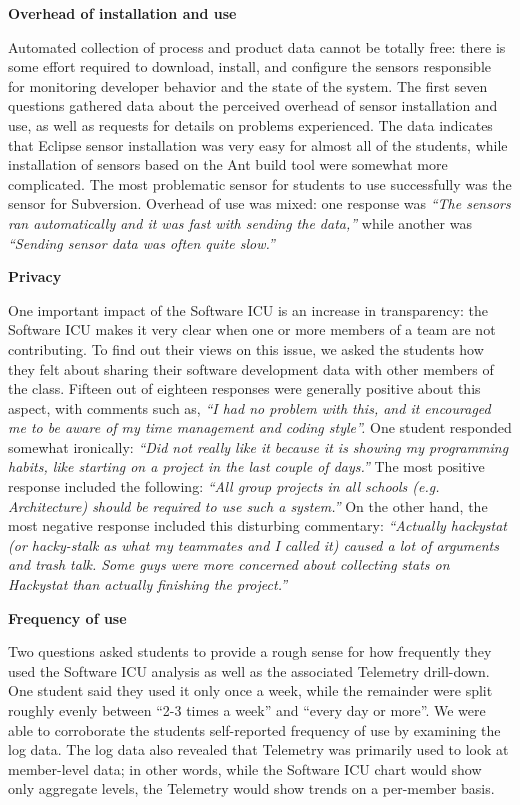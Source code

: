 \documentclass{acm_proc_article-sp}
\begin{document}
{\bf Overhead of installation and use}

Automated collection of process and product data cannot be totally free:
there is some effort required to download, install, and configure the
sensors responsible for monitoring developer behavior and the state of the
system.  The first seven questions gathered data about the perceived
overhead of sensor installation and use, as well as requests for details on
problems experienced. The data indicates that Eclipse sensor installation
was very easy for almost all of the students, while installation of sensors
based on the Ant build tool were somewhat more complicated. The most
problematic sensor for students to use successfully was the sensor for
Subversion.  Overhead of use was mixed: one response was {\em ``The sensors ran
automatically and it was fast with sending the data,''} while another was
{\em ``Sending sensor data was often quite slow.''}  

{\bf Privacy}

One important impact of the Software ICU is an increase in transparency:
the Software ICU makes it very clear when one or more members of a team are
not contributing.  To find out their views on this issue, we asked the
students how they felt about sharing their software development data with
other members of the class.  Fifteen out of eighteen responses were
generally positive about this aspect, with comments such as, {\em ``I had
no problem with this, and it encouraged me to be aware of my time
management and coding style''.}  One student responded somewhat ironically:
{\em ``Did not really like it because it is showing my programming habits,
like starting on a project in the last couple of days.''}  The most
positive response included the following: {\em ``All group projects in all
schools (e.g. Architecture) should be required to use such a system.''}  On
the other hand, the most negative response included this disturbing
commentary: {\em ``Actually hackystat (or hacky-stalk as what my teammates
and I called it) caused a lot of arguments and trash talk.  Some guys were
more concerned about collecting stats on Hackystat than actually finishing
the project.''}

{\bf Frequency of use}

Two questions asked students to provide a rough sense for how frequently
they used the Software ICU analysis as well as the associated Telemetry
drill-down.  One student said they used it only once a week, while the
remainder were split roughly evenly between ``2-3 times a week'' and
``every day or more''.  We were able to corroborate the students
self-reported frequency of use by examining the log data.  The log data
also revealed that Telemetry was primarily used to look at member-level
data; in other words, while the Software ICU chart would show only
aggregate levels, the Telemetry would show trends on a per-member basis.
\end{document}
